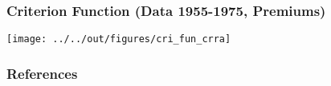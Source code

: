 \documentclass[11pt]{beamer}
\begin{document}
\begin{frame}
    \frametitle{Criterion Function (Data 1955-1975, Premiums)}
    \texttt{[image: ../../out/figures/cri\_fun\_crra]}

\end{frame}

\begin{frame}[allowframebreaks]
    \frametitle{References}
    
    \renewcommand{\bibfont}{\normalfont\footnotesize}
    \printbibliography
    
    
\end{frame}
\end{document}
